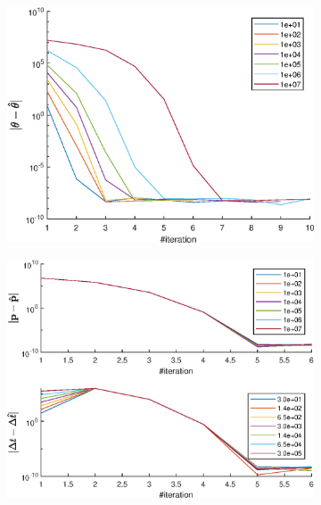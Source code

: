\begin{figure}[!h]
    \centering %
\begin{subfigure}{0.49\textwidth}
  \includegraphics[width=\linewidth]{Results/SimulationEstPos/noiseFreeConv}
\end{subfigure}\hfil %
\medskip
\begin{subfigure}{0.49\textwidth}
  \includegraphics[width=\linewidth]{Results/SimulationEstPos/clockBConv}
\end{subfigure}\hfil %
\medskip
\begin{subfigure}{0.49\textwidth}

\end{subfigure}
\end{figure}
